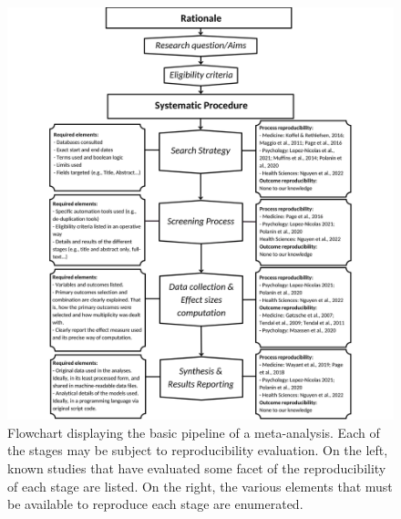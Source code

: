\documentclass[
  ,man,floatsintext]{apa6}
\begin{document}
\begin{figure}
\begin{center}
\includegraphics[width=\textwidth, height=\textheight]{results/Figure 1.png}

\caption{Flowchart displaying the basic pipeline of a meta-analysis. Each of the stages may be subject to reproducibility evaluation. On the left, known studies that have evaluated some facet of the reproducibility of each stage are listed. On the right, the various elements that must be available to reproduce each stage are enumerated.
}

\label{fig:figs1}
\end{center}
\end{figure}
\end{document}

